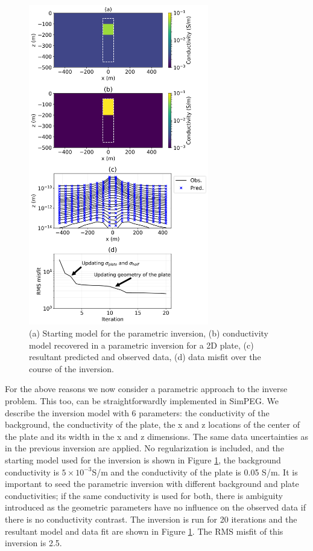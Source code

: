 \documentclass[paper]{geophysics}
\begin{document}
\begin{figure}[!htb]
  \centering
  \includegraphics[width=0.7\textwidth]{figures/2Dparametric_inversion.png}
  \caption{(a) Starting model for the parametric inversion, (b) conductivity model recovered in a parametric inversion for a 2D plate, (c) resultant predicted and observed data, (d) data misfit over the course of the inversion.}
  \label{fig:2Dparametric_inversion}
\end{figure}

For the above reasons we now consider a parametric approach to the inverse problem. This too, can be straightforwardly implemented in SimPEG. We describe the inversion model with 6 parameters: the conductivity of the background, the conductivity of the plate, the x and z locations of the center of the plate and its width in the x and z dimensions. The same data uncertainties as in the previous inversion are applied. No regularization is included, and the starting model used for the inversion is shown in Figure \ref{fig:2Dparametric_inversion}, the background conductivity is $5\times10^{-3}$S/m and the conductivity of the plate is 0.05 S/m. It is important to seed the parametric inversion with different background and plate conductivities; if the same conductivity is used for both, there is ambiguity introduced as the geometric parameters have no influence on the observed data if there is no conductivity contrast. The inversion is run for 20 iterations and the resultant model and data fit are shown in Figure \ref{fig:2Dparametric_inversion}. The RMS misfit of this inversion is 2.5.
\end{document}
